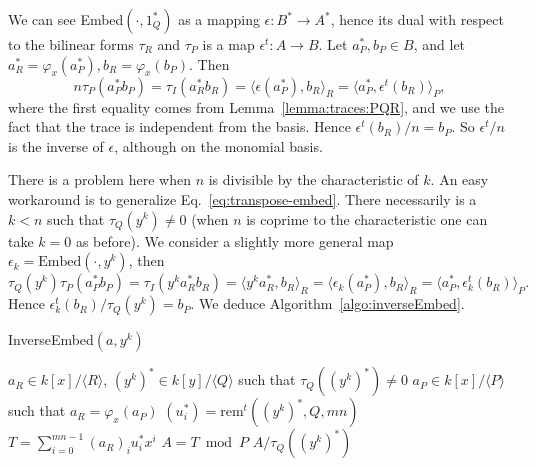 \documentclass[12pt]{article}
\def\rem {\ensuremath{\mathrm{rem}}}
\newcommand{\ang}[1]{\langle#1\rangle}
\begin{document}
We can see Embed$(\cdot,1_Q^\ast)$ as a mapping $\epsilon:B^\ast\to A^\ast$,
hence its dual with respect to the bilinear forms $\tau_R$ and
$\tau_P$ is a map $\epsilon^t:A\to B$. Let $a_P^\ast,b_P\in B$, and
let $a_R^\ast=\varphi_x(a_P^\ast), b_R=\varphi_x(b_P)$. Then
\begin{equation}
  \label{eq:transpose-embed}
  n\tau_P(a_P^\ast b_P) = \tau_I(a_R^\ast b_R) = \ang{\epsilon(a_P^\ast),b_R}_R = \ang{a_P^\ast,\epsilon^t(b_R)}_P,
\end{equation}
where the first equality comes from Lemma~\ref{lemma:traces:PQR}, and
we use the fact that the trace is independent from the basis. Hence
$\epsilon^t(b_R)/n = b_P$.  So $\epsilon^t/n$ is the inverse of
$\epsilon$, although on the monomial basis.

There is a problem here when $n$ is divisible by the characteristic of
$k$. An easy workaround is to generalize
Eq.~\eqref{eq:transpose-embed}.  There necessarily is a $k< n$ such
that $\tau_Q(y^k)\ne 0$ (when $n$ is coprime to the characteristic one
can take $k=0$ as before). We consider a slightly more general map
$\epsilon_k= \mathrm{Embed}(\cdot,y^k)$, then
\begin{equation}
  \label{eq:transpose-embed-2}
  \tau_Q(y^k)\tau_P(a_P^\ast b_P) = \tau_I(y^ka_R^\ast b_R) = \ang{y^ka_R^\ast,b_R}_R = \ang{\epsilon_k(a_P^\ast),b_R}_R = \ang{a_P^\ast,\epsilon_k^t(b_R)}_P.
\end{equation}
Hence $\epsilon_k^t(b_R)/\tau_Q(y^k)=b_P$. We deduce
Algorithm~\ref{algo:inverseEmbed}.

\begin{algorithm}[H]
  \caption{InverseEmbed$(a,y^k)$}
  \begin{algorithmic}[1]
    \REQUIRE $a_R\in k[x]/\ang{R}$, $(y^k)^\ast\in k[y]/\ang{Q}$ such that $\tau_Q((y^k)^\ast)\ne0$
    \ENSURE $a_P\in k[x]/\ang{P}$ such that $a_R=\varphi_x(a_P)$
    \STATE $(u_i^\ast) = \rem^t((y^k)^\ast,Q,mn)$
    \STATE\label{algo:inverseEmbed:psi} $T = \sum_{i=0}^{mn-1} (a_R)_i u_i^\ast x^i$
    \STATE\label{algo:inverseEmbed:mod} $A = T \bmod P$
    \RETURN $A/\tau_Q((y^k)^\ast)$
  \end{algorithmic}\label{algo:inverseEmbed}
\end{algorithm}
\end{document}

